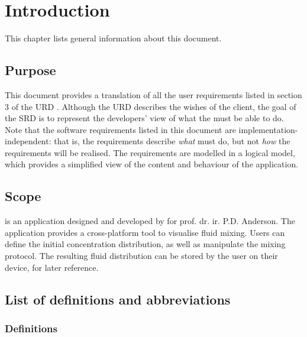 \chapter{Introduction}
This chapter lists general information about this document.

\section{Purpose}
This document provides a translation of all the user requirements listed in section 3 of the URD \cite{urd}. Although the URD describes the wishes of the client, the goal of the SRD is to represent the developers' view of what the \applicationname{} must be able to do.
Note that the software requirements listed in this document are implementation-independent: that is, the requirements describe \emph{what} \projectname{} must do, but not \emph{how} the requirements will be realised. The requirements are modelled in a logical model, which provides a simplified view of the content and behaviour of the application.

\section{Scope}
\projectname{} is an application designed and developed by \projectauthor{} for prof. dr. ir. P.D. Anderson. The application provides a cross-platform tool to visualise fluid mixing. Users can define the initial concentration distribution, as well as manipulate the mixing protocol. The resulting fluid distribution can be stored by the user on their device, for later reference.

\section{List of definitions and abbreviations}

\subsection{Definitions}


